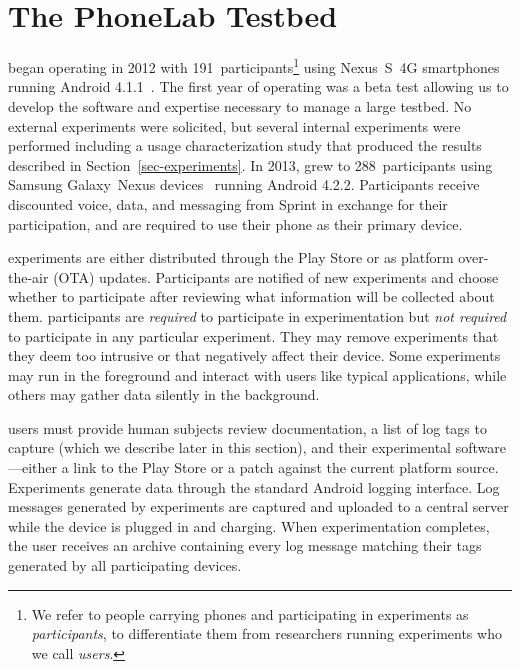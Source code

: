 

\section{The PhoneLab Testbed}
\label{sec-testbed}

\PhoneLab{} began operating in 2012 with 191~participants\footnote{We refer
to people carrying \PhoneLab{} phones and participating in experiments as
\PhoneLab{} \textit{participants}, to differentiate them from researchers
running \PhoneLab{} experiments who we call \textit{users}.} using Nexus~S~4G
smartphones~\cite{nexuss4g} running Android 4.1.1~\cite{jellybean}. The first
year of operating was a beta test allowing us to develop the software and
expertise necessary to manage a large testbed. No external experiments were
solicited, but several internal experiments were performed including a usage
characterization study that produced the results described in
Section~\ref{sec-experiments}. In 2013, \PhoneLab{} grew to 288~participants
using Samsung Galaxy~Nexus devices~\cite{nexuss4g} running Android 4.2.2.
Participants receive discounted voice, data, and messaging from Sprint in
exchange for their participation, and are required to use their \PhoneLab{}
phone as their primary device.

\PhoneLab{} experiments are either distributed through the Play Store or as
platform over-the-air (OTA) updates. Participants are notified of new
experiments and choose whether to participate after reviewing what
information will be collected about them. \PhoneLab{} participants are
\textit{required} to participate in experimentation but \textit{not required}
to participate in any particular experiment. They may remove experiments that
they deem too intrusive or that negatively affect their device. Some
experiments may run in the foreground and interact with users like typical
applications, while others may gather data silently in the background.

\PhoneLab{} users must provide human subjects review documentation, a list of
log tags to capture (which we describe later in this section), and their
experimental software---either a link to the Play Store or a patch against
the current \PhoneLab{} platform source.  Experiments generate data through
the standard Android logging interface. Log messages generated by \PhoneLab{}
experiments are captured and uploaded to a central server while the device is
plugged in and charging. When experimentation completes, the user receives an
archive containing every log message matching their tags generated by all
participating devices.

